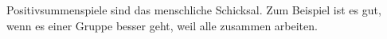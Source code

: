 Positivsummenspiele sind das menschliche Schicksal.
Zum Beispiel ist es gut, wenn es einer Gruppe besser geht, weil alle zusammen arbeiten.